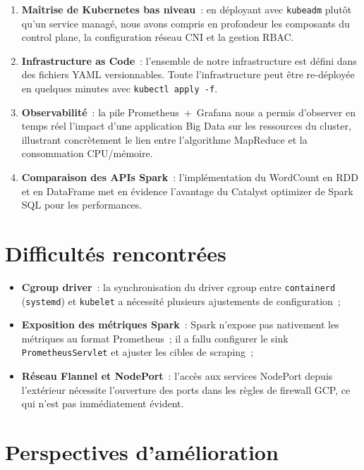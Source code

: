 \documentclass[12pt,a4paper,french]{report}
\newcommand{\cmd}[1]{\texttt{\small\color{keywordcolor}#1}}
\begin{document}
\begin{enumerate}
  \item \textbf{Maîtrise de Kubernetes bas niveau}~: en déployant avec \cmd{kubeadm} plutôt qu'un service managé, nous avons compris en profondeur les composants du control plane, la configuration réseau CNI et la gestion RBAC.
  
  \item \textbf{Infrastructure as Code}~: l'ensemble de notre infrastructure est défini dans des fichiers YAML versionnables. Toute l'infrastructure peut être re-déployée en quelques minutes avec \cmd{kubectl apply -f}.
  
  \item \textbf{Observabilité}~: la pile Prometheus~+~Grafana nous a permis d'observer en temps réel l'impact d'une application Big Data sur les ressources du cluster, illustrant concrètement le lien entre l'algorithme MapReduce et la consommation CPU/mémoire.
  
  \item \textbf{Comparaison des APIs Spark}~: l'implémentation du WordCount en RDD et en DataFrame met en évidence l'avantage du Catalyst optimizer de Spark SQL pour les performances.
\end{enumerate}

\section{Difficultés rencontrées}

\begin{itemize}
  \item \textbf{Cgroup driver}~: la synchronisation du driver cgroup entre \cmd{containerd} (\texttt{systemd}) et \cmd{kubelet} a nécessité plusieurs ajustements de configuration~;
  
  \item \textbf{Exposition des métriques Spark}~: Spark n'expose pas nativement les métriques au format Prometheus~; il a fallu configurer le sink \texttt{PrometheusServlet} et ajuster les cibles de scraping~;
  
  \item \textbf{Réseau Flannel et NodePort}~: l'accès aux services NodePort depuis l'extérieur nécessite l'ouverture des ports dans les règles de firewall GCP, ce qui n'est pas immédiatement évident.
\end{itemize}

\section{Perspectives d'amélioration}
\end{document}
